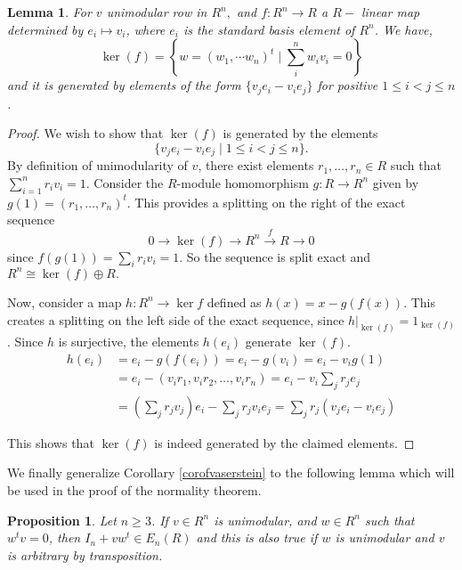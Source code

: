 \documentclass[12pt]{report}
\numberwithin{equation}{section}
\newcounter{dummy} \numberwithin{dummy}{section}
\newtheorem{lemma}[dummy]{Lemma}
\newtheorem{proposition}[dummy]{Proposition}
\begin{document}
		\begin{lemma}\label{kernelf}
			For $v$ unimodular row in $R^n,$ and $f: R^n \to R$ a $R-$ linear map determined by $e_i \mapsto v_i $, where $e_i $ is the standard basis element of $R^n$. We have,
			\[ \ker (f) =\left\{w=(w_1,\cdots w_n)^t \mid \sum_i^n w_i v_i =0\right\} \] and it is generated by elements of the form \( \{ v_j e_i - v_i e_j \} \) for positive $1 \leq i< j \leq n$.
			\end{lemma}
		\begin{proof}
			We wish to show that $\ker(f)$ is generated by the elements $$\{v_je_i - v_ie_j \mid 1 \leq i < j\leq n\}.$$
			By definition of unimodularity of $v$, there exist elements $r_1, \ldots, r_n \in R$ such that $\sum_{i=1}^n r_iv_i = 1$. Consider the 
			$R$-module homomorphism $g: R \to R^n$ given by $g(1) = (r_1, \ldots, r_n)^t$. This provides a splitting 
			on the right of the exact sequence \[ 0 \to \ker (f ) \to R^n \xrightarrow{f} R \to 0 \] since $f(g(1))=\sum_i r_iv_i = 1$. So the sequence is split exact and $R^n \cong \ker (f) \oplus R.$
			
			Now, consider a map $h:R^n \to \ker f$ defined as  $h(x)=x - g(f(x))$. This creates a splitting on the left side of the 
			exact sequence, since  $h|_{\ker(f)} = 1_{\ker(f)}$. Since $h$ is surjective, the 
			elements $h(e_i)$ generate $\ker(f)$.
			\begin{align*}
				h(e_i) &= e_i - g(f(e_i)) = e_i - g(v_i) = e_i-v_ig(1)\\
				&=e_i-(v_ir_1, v_i r_2, \ldots, v_i r_n)= e_i - v_i \sum_j r_je_j\\
				&= (\sum_j r_jv_j)e_i - \sum_j r_jv_ie_j = \sum_j r_j(v_je_i - v_ie_j)
			\end{align*}
			
			This shows that $\ker(f)$ is indeed generated by the claimed elements.
		\end{proof}
		
		We finally generalize Corollary \ref{corofvaserstein} to the following lemma which will be used in the proof of the normality theorem.
		\begin{proposition}\label{finalpropfornormality}
			Let $n \geq 3$. If $v \in R^n$ is unimodular, and $w \in R^n$ such that $w^tv = 0$, then $I_n + vw^t \in E_n(R)$ and this is also true if $w$ is unimodular and $v$ is arbitrary by transposition.
		\end{proposition}
		
\end{document}
